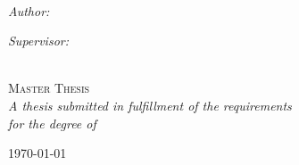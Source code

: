\begin{titlepage}
    \begin{center}
    
        \vspace*{.06\textheight}
        
        {\scshape\LARGE \univname\par}\vspace{1.5cm}
        
        {\huge \bfseries \ttitle\par}\vspace{0.4cm}
        
        \HRule \\[0.4cm]
        
        \begin{minipage}[t]{0.4\textwidth}
            \begin{flushleft} \large
                \emph{Author:}\\
                \authorname
            \end{flushleft}
        \end{minipage}
        \begin{minipage}[t]{0.4\textwidth}
            \begin{flushright} \large
                \emph{Supervisor:} \\
                \supname
            \end{flushright}
        \end{minipage}\\[3cm]
        
        \vfill
        \textsc{\Large Master Thesis}\\[0.5cm]
        
        \vfill
        \large \textit{A thesis submitted in fulfillment of the requirements\\ for the degree of \degreename}\\[0.3cm] %
        
        \begin{minipage}[b]{\textwidth}
            \centering
            \onehalfspacing
            \large   
            \today
            \vspace{-20mm} 
        \end{minipage}
    \end{center}
\end{titlepage}